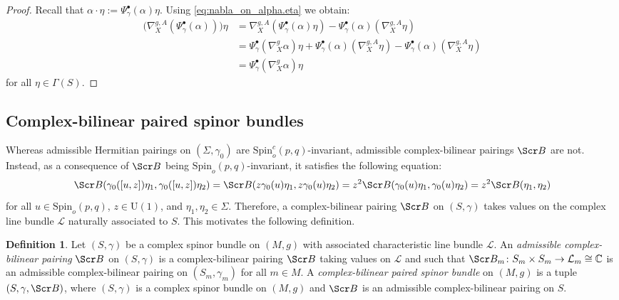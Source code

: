 \documentclass[10pt,a4paper,twoside,reqno]{amsart}
\theoremstyle{plain}
\theoremstyle{definition}
\newtheorem{definition}[thm]{Definition}
\theoremstyle{remark}
\def\C{\mathbb{C}}
\def\scB{\Scr B}
\def\Spin{\mathrm{Spin}}
\def\Spin{\mathrm{Spin}}
\def\U{\mathrm{U}}
\def\cL{\mathcal{L}}
\begin{document}
\begin{proof}
    Recall that $\alpha\cdot\eta:=\Psi^{\bullet}_\gamma(\alpha)\eta$. Using \eqref{eq:nabla_on_alpha.eta} we obtain: \begin{align*}
        \big(\nabla^{g,A}_X(\Psi^{\bullet}_\gamma(\alpha))\big)\eta&=\nabla^{g,A}_X(\Psi^{\bullet}_\gamma(\alpha)\eta)-\Psi^{\bullet}_\gamma(\alpha)(\nabla^{g,A}_X\eta)\\
        &=\Psi^{\bullet}_\gamma(\nabla^g_X\alpha)\eta+\Psi^{\bullet}_\gamma(\alpha)(\nabla^{g,A}_X\eta)-\Psi^{\bullet}_\gamma(\alpha)(\nabla^{g,A}_X\eta)\\
        &=\Psi^{\bullet}_\gamma(\nabla^g_X\alpha)\eta
    \end{align*} for all $\eta\in\Gamma(S)$.
\end{proof} 


\subsection{Complex-bilinear paired spinor bundles}


Whereas admissible Hermitian pairings on $(\Sigma,\gamma_0)$ are $\Spin^c_o(p,q)$-invariant, admissible complex-bilinear pairings $\scB$ are not. Instead, as a consequence of $\scB$ being $\Spin_o(p,q)$-invariant, it satisfies the following equation: 
\begin{equation*}
\scB(\gamma_0([u,z])\eta_1,\gamma_0([u,z])\eta_2)=\scB(z\gamma_0(u)\eta_1,z\gamma_0(u)\eta_2)=z^2\scB(\gamma_0(u)\eta_1,\gamma_0(u)\eta_2)=z^2\scB(\eta_1,\eta_2)    
\end{equation*} 
for all $u\in\Spin_o(p,q)$, $z\in\U(1)$, and $\eta_1,\eta_2\in\Sigma$. Therefore, a complex-bilinear pairing $\scB$ on $(S,\gamma)$ takes values on the complex line bundle $\cL$ naturally associated to $S$. This motivates the following definition.

\begin{definition}
Let $(S,\gamma)$ be a complex spinor bundle on $(M,g)$ with associated characteristic line bundle $\cL$. An \emph{admissible complex-bilinear pairing} $\scB$ on $(S,\gamma)$ is a complex-bilinear pairing $\scB$ taking values on $\cL$ and such that $\scB_m\colon S_m\times S_m\to\cL_m\cong\C$ is an admissible complex-bilinear pairing on $(S_m,\gamma_m)$ for all $m\in M$. A \emph{complex-bilinear paired spinor bundle} on $(M,g)$ is a tuple $(S,\gamma,\scB)$, where $(S,\gamma)$ is a complex spinor bundle on $(M,g)$ and $\scB$ is an admissible complex-bilinear pairing on $S$.
\end{definition}
\end{document}
